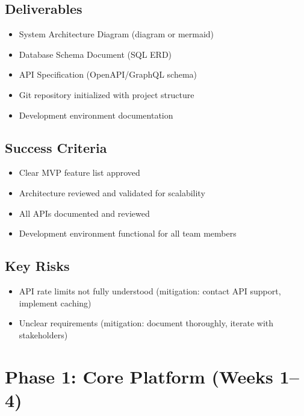 \documentclass[12pt,oneside]{report}
\begin{document}
\subsection{Deliverables}

\begin{itemize}
    \item System Architecture Diagram (diagram or mermaid)
    \item Database Schema Document (SQL ERD)
    \item API Specification (OpenAPI/GraphQL schema)
    \item Git repository initialized with project structure
    \item Development environment documentation
\end{itemize}

\subsection{Success Criteria}

\begin{itemize}
    \item Clear MVP feature list approved
    \item Architecture reviewed and validated for scalability
    \item All APIs documented and reviewed
    \item Development environment functional for all team members
\end{itemize}

\subsection{Key Risks}

\begin{itemize}
    \item API rate limits not fully understood (mitigation: contact API support, implement caching)
    \item Unclear requirements (mitigation: document thoroughly, iterate with stakeholders)
\end{itemize}

\section{Phase 1: Core Platform (Weeks 1--4)}
\end{document}
